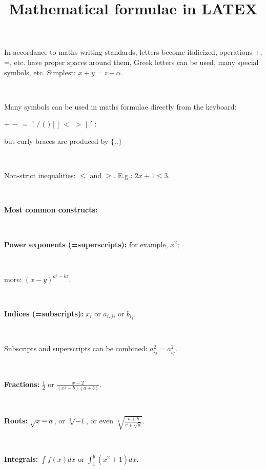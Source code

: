 \documentclass{article}
\begin{document}
\title{Mathematical formulae in LATEX}


\date{}

\maketitle



In accordance to maths
writing standards, letters become italicized, operations +, =, etc. have proper spaces around them, Greek letters can be used, many special symbols, etc. Simplest: $x+y=z-\alpha$.

\ %

Many symbols can be used in maths formulae directly
from the keyboard: %

$+$  $-$  $=$  $!$  $/$  $($  $)$  $[$  $]$  $<$  $>$  $|$  $'$  $:$

but curly braces are produced by $\{ .. \}$

\

Non-strict inequalities: $\leq$  and $\geq$. E.g.: $2x+1\leq 3$.

\

\textbf{Most common constructs:}

\

\textbf{Power exponents (=superscripts):} for example,  $x^{2}$;

\

more: $(x-y)^{a^{2}-bz}$.

\

\textbf{Indices (=subscripts):}  
$x_{i}$ or $a_{i,j}$, or $b_{i_{1}}$.

\

Subscripts and superscripts can be combined: $a_{ij}^{2}=a^2_{ij}$.

\

\textbf{Fractions:} 
$\frac{1}{2}$ or $\frac{x-2}{(x^{2}-b)(a+b)}$.

\


\textbf{Roots:} 
  $\sqrt{x-a}$, or $\sqrt[3]{-1}$,  or even $\sqrt[4]{\frac{a+b}{c+\sqrt{d}}}$.

\

\textbf{Integrals:} 
$\int f(x)dx$ or $\int_{1}^{y}(x^{2}+1)dx$.
\end{document}
